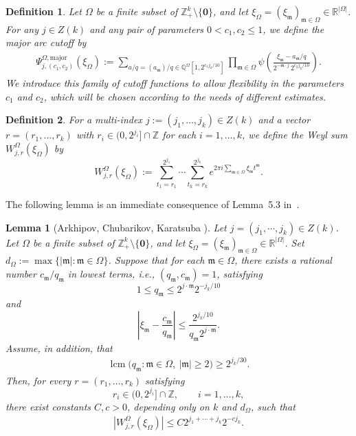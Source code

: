 \documentclass[10pt,a4paper]{amsart}
\newtheorem{lemma}{Lemma}\numberwithin{lemma}{section}
\newtheorem{definition}{Definition}\numberwithin{definition}{section}
\numberwithin{equation}{section}
\begin{document}
\begin{definition}
	Let $\Omega$ be a finite subset of $\mathbb{Z}_+^k \setminus \{\mathbf{0}\}$, and let 
$\xi_{\Omega} = (\xi_{\mathfrak{m}})_{\mathfrak{m}\in\Omega} \in \mathbb{R}^{|\Omega|}$. 
For any $j \in Z(k)$ and any  pair of parameters $0 < c_1, c_2 \le 1$, we define the major arc cutoff by
\begin{align}\label{t12}
\Psi_{j,(c_1,c_2)}^{\Omega,\mathrm{major}}(\xi_{\Omega})
:= \sum_{a/q=(a_{\mathfrak{m}})/q \in \mathbb{Q}^{\Omega}[1,2^{c_1 j_k/10}]}
\prod_{\mathfrak{m}\in \Omega} 
\psi\!\left(
\frac{\xi_{\mathfrak{m}} - a_{\mathfrak{m}}/q}
{2^{-\mathfrak{m}\cdot j}\, 2^{c_2 j_k/10}}
\right).
\end{align}
We introduce this family of cutoff functions to allow flexibility in the parameters $c_1$ and $c_2$, which will be chosen according to the needs of different estimates.
\end{definition}
\begin{definition}\label{defi33}
For a multi-index $j := (j_1, \dots, j_k) \in Z(k)$ and a vector $r = (r_1, \dots, r_k)$ with $r_i \in (0, 2^{j_i}] \cap \mathbb{Z}$ for each $i = 1, \dots, k$, we define the Weyl sum $W_{j,r}^{\Omega}(\xi_\Omega)$ by
\[
W_{j,r}^{\Omega}(\xi_\Omega) := \sum_{t_1=r_1}^{2^{j_1}} \cdots \sum_{t_k=r_k}^{2^{j_k}} e^{2\pi i \sum_{\mathfrak{m} \in \Omega} \xi_{\mathfrak{m}} t^{\mathfrak{m}}}.
\]
\end{definition}


The following lemma is an immediate consequence of Lemma~5.3 in~\cite{ACK}.
\begin{lemma}[Arkhipov, Chubarikov, Karatsuba \cite{ACK}]\label{lem:ACK_bound}
Let $j=(j_1,\cdots,j_k) \in Z(k) $.	Let $\Omega$ be a finite subset of $\mathbb{Z}_+^k \setminus \{\mathbf{0}\}$, and let 
$\xi_{\Omega} = (\xi_{\mathfrak{m}})_{\mathfrak{m}\in\Omega} \in \mathbb{R}^{|\Omega|}$. Set $d_{\Omega}:=\max\{|\mathfrak{m}|:\mathfrak{m}\in \Omega\}$.  Suppose that for each $\mathfrak{m} \in \Omega$, there exists a   rational number $c_{\mathfrak{m}}/q_{\mathfrak{m}}$ in lowest terms, i.e., $(q_{\mathfrak{m}}, c_{\mathfrak{m}}) = 1$, satisfying 
\[
1 \le q_{\mathfrak{m}} \le 2^{j \cdot \mathfrak{m}} 2^{-j_k/10}
\]
and
\[
\left| \xi_{\mathfrak{m}} - \frac{c_{\mathfrak{m}}}{q_{\mathfrak{m}}} \right| \le \frac{2^{j_k/10}}{q_{\mathfrak{m}} 2^{j \cdot \mathfrak{m}}}.
\]
 Assume, in addition, that \begin{align} \label{dmm1} \operatorname{lcm} \bigl(q_{\mathfrak m}:\mathfrak m\in\Omega,\ |\mathfrak m|\geq 2\bigr) \geq 2^{j_k/30}. \end{align} Then, for every $r=(r_1,\ldots,r_k)$ satisfying \[ r_i\in(0,2^{j_i}]\cap\mathbb{Z}, \qquad i=1,\ldots,k, \] there exist constants $C,c>0$, depending only on $k$ and $d_{\Omega}$, such that \begin{align} \label{wop} \left| W_{j,r}^{\Omega}(\xi_{\Omega}) \right| \leq C2^{j_1+\cdots+j_k}2^{-cj_k}. \end{align} \end{lemma}
\end{document}
